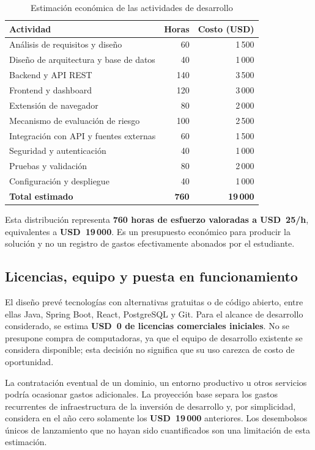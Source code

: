 \begin{table}[htbp]
\centering
\caption{Estimación económica de las actividades de desarrollo}
\label{tab:ml-inversion-desarrollo}
\small
\begin{tabularx}{\textwidth}{@{}X r r@{}}
\toprule
\textbf{Actividad} & \textbf{Horas} & \textbf{Costo (USD)} \\
\midrule
Análisis de requisitos y diseño & 60 & 1\,500 \\
Diseño de arquitectura y base de datos & 40 & 1\,000 \\
Backend y API REST & 140 & 3\,500 \\
Frontend y dashboard & 120 & 3\,000 \\
Extensión de navegador & 80 & 2\,000 \\
Mecanismo de evaluación de riesgo & 100 & 2\,500 \\
Integración con API y fuentes externas & 60 & 1\,500 \\
Seguridad y autenticación & 40 & 1\,000 \\
Pruebas y validación & 80 & 2\,000 \\
Configuración y despliegue & 40 & 1\,000 \\
\midrule
\textbf{Total estimado} & \textbf{760} & \textbf{19\,000} \\
\bottomrule
\end{tabularx}
\end{table}

Esta distribución representa \textbf{760 horas de esfuerzo valoradas a USD~25/h}, equivalentes a \textbf{USD~19\,000}. Es un presupuesto económico para producir la solución y no un registro de gastos efectivamente abonados por el estudiante.

\subsection{Licencias, equipo y puesta en funcionamiento}

El diseño prevé tecnologías con alternativas gratuitas o de código abierto, entre ellas Java, Spring Boot, React, PostgreSQL y Git. Para el alcance de desarrollo considerado, se estima \textbf{USD~0 de licencias comerciales iniciales}. No se presupone compra de computadoras, ya que el equipo de desarrollo existente se considera disponible; esta decisión no significa que su uso carezca de costo de oportunidad.

La contratación eventual de un dominio, un entorno productivo u otros servicios podría ocasionar gastos adicionales. La proyección base separa los gastos recurrentes de infraestructura de la inversión de desarrollo y, por simplicidad, considera en el año cero solamente los \textbf{USD~19\,000} anteriores. Los desembolsos únicos de lanzamiento que no hayan sido cuantificados son una limitación de esta estimación.

